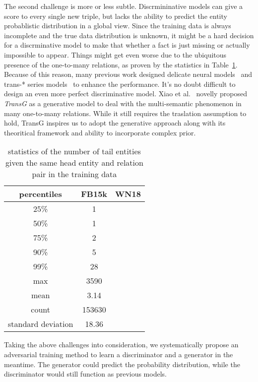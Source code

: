 \documentclass[twocolumn,a4paper,10pt,review,3p]{elsarticle}
\begin{document}
The second challenge is more or less subtle. Discrmininative models can give a score to every single new triple, but lacks the ability to predict the entity probablistic distribution in a global view. Since the training data is always incomplete and the true data distribution is unknown, it might be a hard decision for a discrminative model to make that whether a fact is just missing or actually impossible to appear. Things might get even worse due to the ubiquitous presence of the one-to-many relations, as proven by the statistics in Table~\ref{one-to-many}. Because of this reason, many previous work designed delicate neural models~\cite{NTN} and trans-* series models~\cite{TransH2014,TransR2015} to enhance the performance. It's no doubt difficult to design an even more perfect discriminative model. Xiao et al.~\cite{TransG} novelly proposed \emph{TransG} as a generative model to deal with the multi-semantic phenomenon in many one-to-many relations. While it still requires the traslation assumption to hold, TransG inspires us to adopt the generative approach along with its theoritical framework and ability to incorporate complex prior.

\begin{table}
    \centering
    \begin{tabular}{ccc}
        \toprule
        percentiles & FB15k & WN18 \\
        \midrule
        25\% &  1   &  \\
        50\% &  1   &  \\
        75\% &  2   &  \\
        90\% &  5   &  \\
        99\% &  28  &  \\
        max & 3590  &  \\
        \midrule
        mean &  3.14 & \\
        count & 153630 & \\
        standard deviation & 18.36 & \\
        \bottomrule
    \end{tabular}
    \caption{statistics of the number of tail entities given the same head entity and relation pair in the training data}
\label{one-to-many}
\end{table}

Taking the above challenges into consideration, we systematically propose an adversarial training method to learn a discriminator and a generator in the meantime. The generator could predict the probability distribution, while the discriminator would still function as previous models.
\end{document}
